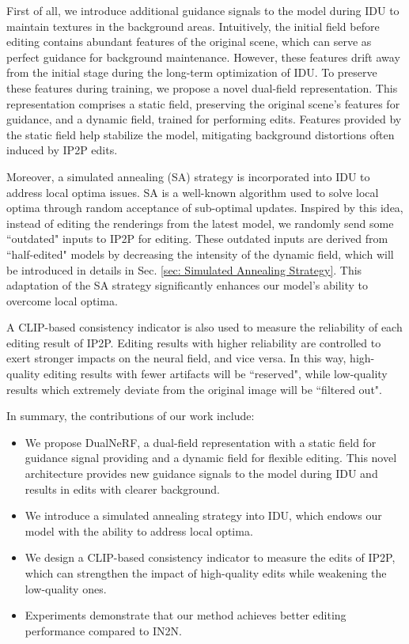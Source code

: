 First of all, we introduce additional guidance signals to the model during IDU to maintain textures in the background areas.
Intuitively, the initial field before editing contains abundant features of the original scene, which can serve as perfect guidance for background maintenance. However, these features drift away from the initial stage during the long-term optimization of IDU. To preserve these features during training, we propose a novel dual-field representation.
This representation comprises a static field, preserving the original scene's features for guidance, and a dynamic field, trained for performing edits. Features provided by the static field help stabilize the model, mitigating background distortions often induced by IP2P edits.

Moreover, a simulated annealing (SA) strategy \cite{kirkpatrick1983optimization} is incorporated into IDU to address local optima issues. SA is a well-known algorithm used to solve local optima through random acceptance of sub-optimal updates. Inspired by this idea, instead of editing the renderings from the latest model, we randomly send some ``outdated" inputs to IP2P for editing. These outdated inputs are derived from ``half-edited" models by decreasing the intensity of the dynamic field, which will be introduced in details in Sec. \ref{sec: Simulated Annealing Strategy}.
This adaptation of the SA strategy significantly enhances our model's ability to overcome local optima.

A CLIP-based consistency indicator is also used to measure the reliability of each editing result of IP2P. Editing results with higher reliability are controlled to exert stronger impacts on the neural field, and vice versa. In this way, high-quality editing results with fewer artifacts will be ``reserved", while low-quality results which extremely deviate from the original image will be ``filtered out".

In summary, the contributions of our work include:
\begin{itemize}
    \item We propose DualNeRF, a dual-field representation with a static field for guidance signal providing and a dynamic field for flexible editing. This novel architecture provides new guidance signals to the model during IDU and results in edits with clearer background.
    \item We introduce a simulated annealing strategy into IDU, which endows our model with the ability to address local optima.
    \item We design a CLIP-based consistency indicator to measure the edits of IP2P, which can strengthen the impact of high-quality edits while weakening the low-quality ones.
    \item Experiments demonstrate that our method achieves better editing performance compared to IN2N.
\end{itemize}
